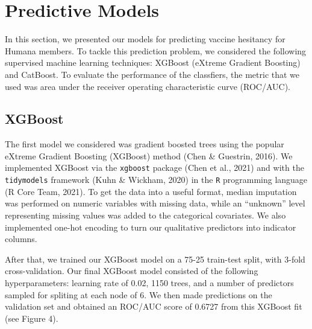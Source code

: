 \documentclass[
  12pt,
]{article}
\begin{document}
\newpage

\hypertarget{predictive-models}{%
\section{Predictive Models}\label{predictive-models}}

In this section, we presented our models for predicting vaccine
hesitancy for Humana members. To tackle this prediction problem, we
considered the following supervised machine learning techniques: XGBoost
(eXtreme Gradient Boosting) and CatBoost. To evaluate the performance of
the classfiers, the metric that we used was area under the receiver
operating characteristic curve (ROC/AUC).

\hypertarget{xgboost}{%
\subsection{XGBoost}\label{xgboost}}

The first model we considered was gradient boosted trees using the
popular eXtreme Gradient Boosting (XGBoost) method (Chen \& Guestrin,
2016). We implemented XGBoost via the \texttt{xgboost} package (Chen et
al., 2021) and with the \texttt{tidymodels} framework (Kuhn \& Wickham,
2020) in the \texttt{R} programming language (R Core Team, 2021). To get
the data into a useful format, median imputation was performed on
numeric variables with missing data, while an ``unknown'' level
representing missing values was added to the categorical covariates. We
also implemented one-hot encoding to turn our qualitative predictors
into indicator columns.

After that, we trained our XGBoost model on a 75-25 train-test split,
with 3-fold cross-validation. Our final XGBoost model consisted of the
following hyperparameters: learning rate of 0.02, 1150 trees, and a
number of predictors sampled for spliting at each node of 6. We then
made predictions on the validation set and obtained an ROC/AUC score of
0.6727 from this XGBoost fit (see Figure 4).
\end{document}
